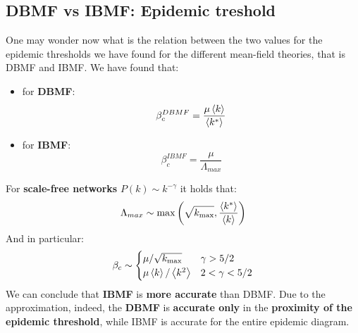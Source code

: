 \documentclass[../main/main.tex]{subfiles}
\begin{document}
\subsection{DBMF vs IBMF: Epidemic treshold}
One may wonder now what is the relation between the two values for the epidemic thresholds we have found for the different mean-field theories, that is DBMF and IBMF. We have found that:
\begin{itemize}
\item for \textbf{DBMF}:
\begin{equation*}
  \beta _c^{DBMF} = \frac{\mu \expval{k} }{\expval{k^*} }
\end{equation*}

\item for \textbf{IBMF}:
\begin{equation*}
\beta _c^{IBMF} = \frac{\mu }{\Lambda _{max}}
\end{equation*}
\end{itemize}
For \textbf{scale-free networks} \( P(k) \sim k^{-\gamma  } \) it holds that:
\begin{equation}
  \Lambda _{max} \sim \max \qty(\sqrt{k_{\max}}, \frac{\expval{k^*}}{\expval{k}}   )
\end{equation}
And in particular:
\begin{equation}
\beta _c \sim
  \begin{cases}
   \mu / \sqrt{k_{\max}} & \gamma > 5/2  \\
   \mu \expval{k}/\expval{k^2} & 2 < \gamma < 5/2
  \end{cases}
\end{equation}
We can conclude that \textbf{IBMF} is \textbf{more accurate} than DBMF. Due to the approximation, indeed, the \textbf{DBMF} is  \textbf{accurate only} in the \textbf{proximity of the epidemic threshold}, while IBMF is accurate for the entire epidemic diagram.
\end{document}
